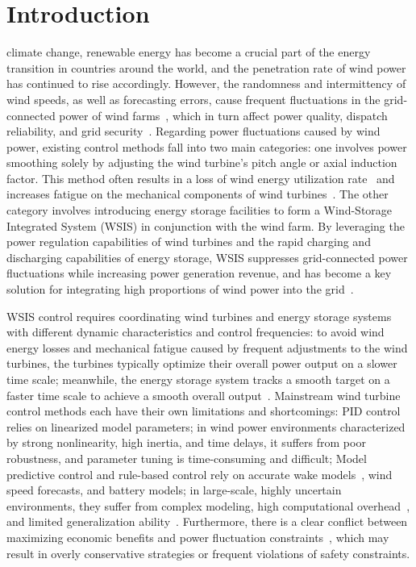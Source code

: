 \documentclass[lettersize,journal]{IEEEtran}
\begin{document}
\section{Introduction}
 climate change, renewable energy has become a crucial part of the energy transition in countries around the world, and the penetration rate of wind power has continued to rise accordingly. However, the randomness and intermittency of wind speeds, as well as forecasting errors, cause frequent fluctuations in the grid-connected power of wind farms~\cite{ref1}, which in turn affect power quality, dispatch reliability, and grid security~\cite{ref2,ref3}. Regarding power fluctuations caused by wind power, existing control methods fall into two main categories: one involves power smoothing solely by adjusting the wind turbine's pitch angle or axial induction factor. This method often results in a loss of wind energy utilization rate~\cite{ref4} and increases fatigue on the mechanical components of wind turbines~\cite{ref5}. The other category involves introducing energy storage facilities to form a Wind-Storage Integrated System (WSIS) in conjunction with the wind farm. By leveraging the power regulation capabilities of wind turbines and the rapid charging and discharging capabilities of energy storage, WSIS suppresses grid-connected power fluctuations while increasing power generation revenue, and has become a key solution for integrating high proportions of wind power into the grid~\cite{ref6}.

WSIS control requires coordinating wind turbines and energy storage systems with different dynamic characteristics and control frequencies: to avoid wind energy losses and mechanical fatigue caused by frequent adjustments to the wind turbines, the turbines typically optimize their overall power output on a slower time scale; meanwhile, the energy storage system tracks a smooth target on a faster time scale to achieve a smooth overall output~\cite{ref7}. Mainstream wind turbine control methods each have their own limitations and shortcomings: PID control relies on linearized model parameters; in wind power environments characterized by strong nonlinearity, high inertia, and time delays, it suffers from poor robustness, and parameter tuning is time-consuming and difficult; Model predictive control and rule-based control rely on accurate wake models~\cite{ref8}, wind speed forecasts, and battery models; in large-scale, highly uncertain environments, they suffer from complex modeling, high computational overhead~\cite{ref9,ref10}, and limited generalization ability~\cite{ref11}. Furthermore, there is a clear conflict between maximizing economic benefits and power fluctuation constraints~\cite{ref12}, which may result in overly conservative strategies or frequent violations of safety constraints.
\end{document}
